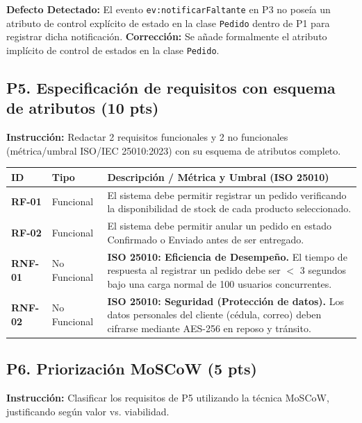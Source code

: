 \documentclass[12pt,a4paper]{article}
\begin{document}
\textbf{Defecto Detectado:} El evento \texttt{ev:notificarFaltante} en P3 no poseía un atributo de control explícito de estado en la clase \texttt{Pedido} dentro de P1 para registrar dicha notificación.  
\textbf{Corrección:} Se añade formalmente el atributo implícito de control de estados en la clase \texttt{Pedido}.


\subsection*{P5. Especificación de requisitos con esquema de atributos (10 pts)}
\textbf{Instrucción:} Redactar 2 requisitos funcionales y 2 no funcionales (métrica/umbral ISO/IEC 25010:2023) con su esquema de atributos completo.

\begin{table}[H]
\centering
\small
\begin{tabularx}{\textwidth}{|l|l|X|}
\hline
\textbf{ID} & \textbf{Tipo} & \textbf{Descripción / Métrica y Umbral (ISO 25010)} \\
\hline
\textbf{RF-01} & Funcional & El sistema debe permitir registrar un pedido verificando la disponibilidad de stock de cada producto seleccionado. \\
\hline
\textbf{RF-02} & Funcional & El sistema debe permitir anular un pedido en estado Confirmado o Enviado antes de ser entregado. \\
\hline
\textbf{RNF-01} & No Funcional & \textbf{ISO 25010: Eficiencia de Desempeño.} El tiempo de respuesta al registrar un pedido debe ser $<$ 3 segundos bajo una carga normal de 100 usuarios concurrentes. \\
\hline
\textbf{RNF-02} & No Funcional & \textbf{ISO 25010: Seguridad (Protección de datos).} Los datos personales del cliente (cédula, correo) deben cifrarse mediante AES-256 en reposo y tránsito. \\
\hline
\end{tabularx}
\end{table}

\newpage

\subsection*{P6. Priorización MoSCoW (5 pts)}
\textbf{Instrucción:} Clasificar los requisitos de P5 utilizando la técnica MoSCoW, justificando según valor vs. viabilidad.
\end{document}
